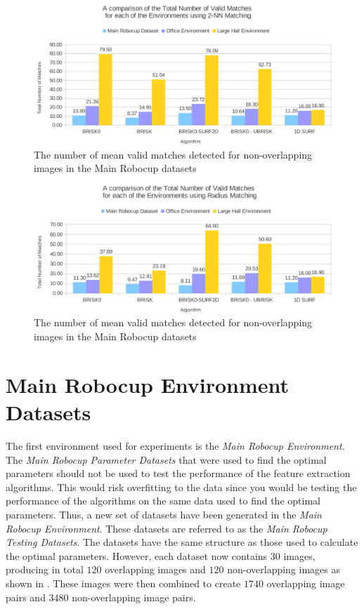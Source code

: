 \begin{figure}
  \centering
    \includegraphics[width=1.0\textwidth]{../Drawings/Graphs/overall_nvm.pdf}
    \caption{The number of mean valid matches detected for non-overlapping images in the Main Robocup datasets} 
    \label{fig:overall_nvm}
\end{figure}

\begin{figure}
  \centering
    \includegraphics[width=1.0\textwidth]{../Drawings/Graphs/overall_nvm_radius.pdf}
    \caption{The number of mean valid matches detected for non-overlapping images in the Main Robocup datasets} 
    \label{fig:overall_nvm_radius}
\end{figure}

\section{Main Robocup Environment Datasets}
\label{sec:mrdPerformance}
The first environment used for experiments is the \textit{Main Robocup Environment}. The \textit{Main Robocup Parameter Datasets} that were used to find the optimal parameters should not be used to test the performance of the feature extraction algorithms. This would risk overfitting to the data since you would be testing the performance of the algorithms on the same data used to find the optimal parameters. Thus, a new set of datasets have been generated in the \textit{Main Robocup Environment}. These datasets are referred to as the \textit{Main Robocup Testing Datasets}. The datasets have the same structure as those used to calculate the optimal parameters. However, each dataset now contains $30$ images, producing in total $120$ overlapping images and $120$ non-overlapping images as shown in . These images were then combined to create $1740$ overlapping image pairs and $3480$ non-overlapping image pairs.\\


